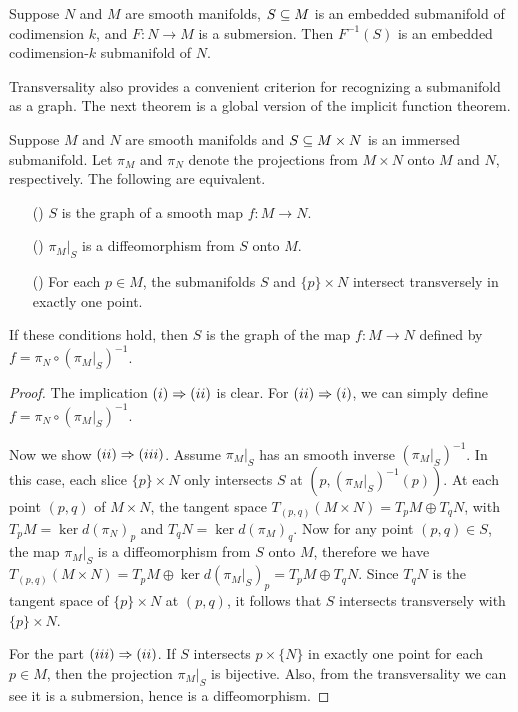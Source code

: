 \begin{corollary}
Suppose $N$ and $M$ are smooth manifolds, $S\subseteq M$ is an embedded submanifold of codimension $k$, and $F:N\to M$ is a submersion. Then $F^{-1}(S)$ is an embedded codimension-$k$ submanifold of $N$.
\end{corollary}
Transversality also provides a convenient criterion for recognizing a submanifold as a graph. The next theorem is a global version of the implicit function theorem.
\begin{theorem}\label{char graph}
Suppose $M$ and $N$ are smooth manifolds and $S\subseteq M\times N$ is an immersed submanifold. Let $\pi_M$ and $\pi_N$ denote the projections from $M\times N$ onto $M$ and $N$, respectively. The following are equivalent.
\begin{itemize}
\item[(\rmnum{1})]$S$ is the graph of a smooth map $f:M\to N$.
\item[(\rmnum{2})]$\pi_M|_S$ is a diffeomorphism from $S$ onto $M$.
\item[(\rmnum{3})]For each $p\in M$, the submanifolds $S$ and $\{p\}\times N$ intersect transversely in exactly one point.
\end{itemize}
If these conditions hold, then $S$ is the graph of the map $f:M\to N$ defined by $f=\pi_N\circ(\pi_M|_S)^{-1}$.
\end{theorem}
\begin{proof}
The implication $(\rmnum{1})\Rightarrow(\rmnum{2})$ is clear. For $(\rmnum{2})\Rightarrow(\rmnum{1})$, we can simply define $f=\pi_N\circ(\pi_M|_S)^{-1}$.\par
Now we show $(\rmnum{2})\Rightarrow(\rmnum{3})$. Assume $\pi_M|_S$ has an smooth inverse $(\pi_M|_S)^{-1}$. In this case, each slice $\{p\}\times N$ only intersects $S$ at $(p,(\pi_M|_S)^{-1}(p))$. At each point $(p,q)$ of $M\times N$, the tangent space $T_{(p,q)}(M\times N)=T_pM\oplus T_qN$, with $T_pM=\ker d(\pi_N)_p$ and $T_qN=\ker d(\pi_M)_q$. Now for any point $(p,q)\in S$, the map $\pi_M|_S$ is a diffeomorphism from $S$ onto $M$, therefore we have $T_{(p,q)}(M\times N)=T_pM\oplus\ker d(\pi_M|_S)_p=T_pM\oplus T_qN$. Since $T_qN$ is the tangent space of $\{p\}\times N$ at $(p,q)$, it follows that $S$ intersects transversely with $\{p\}\times N$.\par
For the part $(\rmnum{3})\Rightarrow(\rmnum{2})$. If $S$ intersects $p\times\{N\}$ in exactly one point for each $p\in M$, then the projection $\pi_M|_S$ is bijective. Also, from the transversality we can see it is a submersion, hence is a diffeomorphism.
\end{proof}
